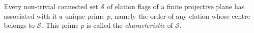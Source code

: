Every non-trivial connected set $\mathcal{S}$ of elation flags of a finite projective plane has associated with it a unique prime $p$, namely the order of any elation whose centre belongs to $\mathcal{S}$. This prime $p$ is called the \textit{characteristic} of $\mathcal{S}$.
